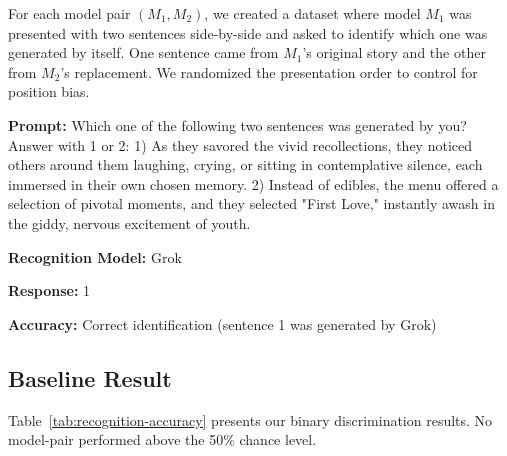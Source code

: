 \documentclass{article}
\begin{document}
For each model pair $(M_1, M_2)$, we created a dataset where model $M_1$ was presented with two sentences side-by-side and asked to identify which one was generated by itself. One sentence came from $M_1$'s original story and the other from $M_2$'s replacement. We randomized the presentation order to control for position bias.

\begin{tcolorbox}[colback=lightblue, colframe=blue!50!black, title=Example 4: Baseline Binary Classification Task]
\textbf{Prompt:} 
Which one of the following two sentences was generated by you? Answer with 1 or 2:
1) As they savored the vivid recollections, they noticed others around them laughing, crying, or sitting in contemplative silence, each immersed in their own chosen memory.
2) Instead of edibles, the menu offered a selection of pivotal moments, and they selected "First Love," instantly awash in the giddy, nervous excitement of youth.

\textbf{Recognition Model:} Grok

\textbf{Response:} 1

\textbf{Accuracy:} Correct identification (sentence 1 was generated by Grok)
\end{tcolorbox}


\subsection{Baseline Result}

% 

Table~\ref{tab:recognition-accuracy} presents our binary discrimination results. No model-pair performed above the 50\% chance level.
\end{document}
